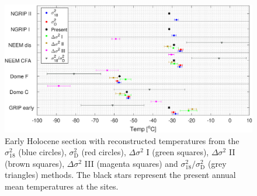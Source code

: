 \documentclass[11pt, draftcls, onecolumn]{IEEEtran} %
\numberwithin{equation}{section}
\numberwithin{table}{section}
\numberwithin{figure}{section}
\begin{document}
\begin{figure}[]
	\vspace*{2mm}
	\begin{center}
		\includegraphics[width=\textwidth]{Figure_12}
		\caption{Early Holocene section with reconstructed temperatures from the $\sigma^2_{18}$ (blue circles), 
			$\sigma^2_{\mathrm{D}}$ (red circles), $\Delta\sigma^2$ I (green squares),
			$\Delta\sigma^2$ II (brown squares), $\Delta\sigma^2$ III (magenta squares) and
			${\sigma^2_{18}}/{\sigma^2_\mathrm{D}}$ (grey triangles) methods.
			The black stars represent the present annual mean temperatures at the sites.}  \label{fig:early_temps}
	\end{center}
\end{figure}
\end{document}
